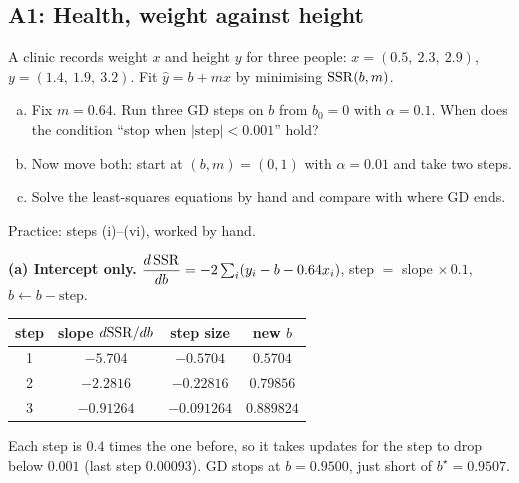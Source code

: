\subsection{A1: Health, weight against height}

\begin{frame}{}
  \begin{probbox}
    A clinic records weight $x$ and height $y$ for three people: $x = (0.5,\ 2.3,\ 2.9)$, $y = (1.4,\ 1.9,\ 3.2)$.
    Fit $\hat y = b + m x$ by minimising $\mathrm{SSR}(b, m)$.
    \begin{enumerate}[(a)]
      \item Fix $m = 0.64$. Run three GD steps on $b$ from $b_0 = 0$ with $\alpha = 0.1$.
            When does the condition ``stop when $|\text{step}| < 0.001$'' hold?
      \item Now move both: start at $(b, m) = (0, 1)$ with $\alpha = 0.01$ and take two steps.
      \item Solve the least-squares equations by hand and compare with where GD ends.
    \end{enumerate}
  \end{probbox}
  \footnotesize\textcolor{mGrey}{Practice: steps (i)--(vi), worked by hand.}
\end{frame}

\begin{frame}{}
  \textbf{(a) Intercept only.} $\dfrac{d\,\mathrm{SSR}}{db} = -2\sum_i(y_i - b - 0.64x_i)$, step $=$ slope $\times\,0.1$, $b \leftarrow b - \text{step}$.
  \begin{center}\small
  \begin{tabular}{@{}c c c c@{}}
    \toprule
    step & slope $d\mathrm{SSR}/db$ & step size & new $b$ \\
    \midrule
    1 & $-5.704$ & $-0.5704$ & $0.5704$ \\
    2 & $-2.2816$ & $-0.22816$ & $0.79856$ \\
    3 & $-0.91264$ & $-0.091264$ & $0.889824$ \\
    \bottomrule
  \end{tabular}
  \end{center}
  Each step is $0.4$ times the one before, so it takes  updates for the step to drop below $0.001$
  (last step $0.00093$). GD stops at $b = 0.9500$, just short of $b^\star = 0.9507$.
\end{frame}


